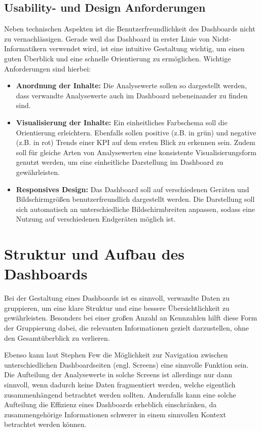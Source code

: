 \subsection{Usability- und Design Anforderungen}
\label{sssec:usability}
Neben technischen Aspekten ist die Benutzerfreundlichkeit des Dashboards nicht zu vernachlässigen. Gerade weil das Dashboard in erster Linie von Nicht-Informatikern verwendet wird, ist eine intuitive Gestaltung wichtig, um einen guten Überblick und eine schnelle Orientierung zu ermöglichen. Wichtige Anforderungen sind hierbei:
\begin{itemize}
    \item \textbf{Anordnung der Inhalte:} Die Analysewerte sollen so dargestellt werden, dass verwandte Analysewerte auch im Dashboard nebeneinander zu finden sind.
    \item \textbf{Visualisierung der Inhalte:} Ein einheitliches Farbschema soll die Orientierung erleichtern. Ebenfalls sollen positive (z.B. in grün) und negative (z.B. in rot) Trends einer KPI auf dem ersten Blick zu erkennen sein. Zudem soll für gleiche Arten von Analysewerten eine konsistente Visualisierungsform genutzt werden, um eine einheitliche Darstellung im Dashboard zu gewährleisten.
    \item \textbf{Responsives Design:} Das Dashboard soll auf verschiedenen Geräten und Bildschirmgrößen benutzerfreundlich dargestellt werden. Die Darstellung soll sich automatisch an unterschiedliche Bildschirmbreiten anpassen, sodass eine Nutzung auf verschiedenen Endgeräten möglich ist.
\end{itemize}

\section{Struktur und Aufbau des Dashboards}
Bei der Gestaltung eines Dashboards ist es sinnvoll, verwandte Daten zu gruppieren, um eine klare Struktur und eine bessere Übersichtlichkeit zu gewährleisten. Besonders bei einer großen Anzahl an Kennzahlen hilft diese Form der Gruppierung dabei, die relevanten Informationen gezielt darzustellen, ohne den Gesamtüberblick zu verlieren. \parencite[Kap.14.3]{Hassler2019}

Ebenso kann laut Stephen Few die Möglichkeit zur Navigation zwischen unterschiedlichen Dashboardseiten (engl. Screens) eine sinnvolle Funktion sein. Die Aufteilung der Analysewerte in solche Screens ist allerdings nur dann sinnvoll, wenn dadurch keine Daten fragmentiert werden, welche eigentlich zusammenhängend betrachtet werden sollten. Andernfalls kann eine solche Aufteilung die Effizienz eines Dashboards erheblich einschränken, da zusammengehörige Informationen schwerer in einem sinnvollen Kontext betrachtet werden können.\parencite[Kap.3.1.1]{Few2006}

